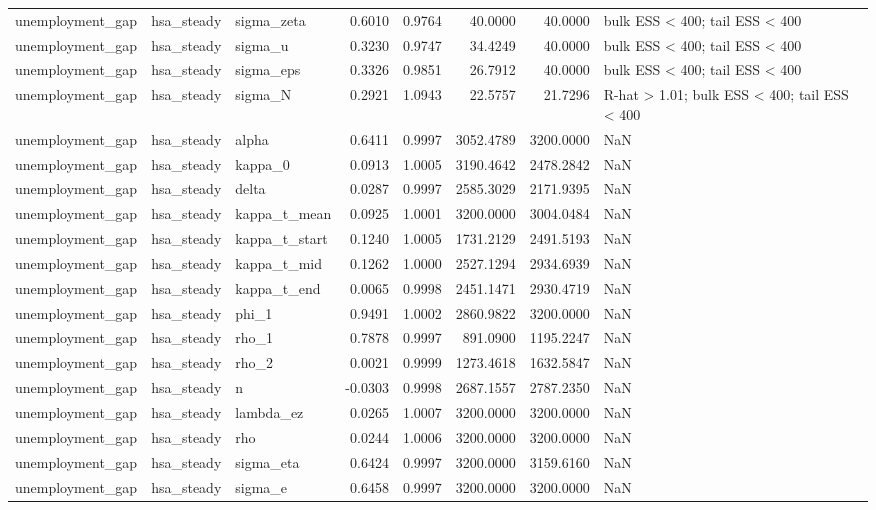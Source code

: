 \begin{tabular}{lllrrrrl}
unemployment\_gap & hsa\_steady & sigma\_zeta & 0.6010 & 0.9764 & 40.0000 & 40.0000 & bulk ESS < 400; tail ESS < 400 \\
unemployment\_gap & hsa\_steady & sigma\_u & 0.3230 & 0.9747 & 34.4249 & 40.0000 & bulk ESS < 400; tail ESS < 400 \\
unemployment\_gap & hsa\_steady & sigma\_eps & 0.3326 & 0.9851 & 26.7912 & 40.0000 & bulk ESS < 400; tail ESS < 400 \\
unemployment\_gap & hsa\_steady & sigma\_N & 0.2921 & 1.0943 & 22.5757 & 21.7296 & R-hat > 1.01; bulk ESS < 400; tail ESS < 400 \\
unemployment\_gap & hsa\_steady & alpha & 0.6411 & 0.9997 & 3052.4789 & 3200.0000 & NaN \\
unemployment\_gap & hsa\_steady & kappa\_0 & 0.0913 & 1.0005 & 3190.4642 & 2478.2842 & NaN \\
unemployment\_gap & hsa\_steady & delta & 0.0287 & 0.9997 & 2585.3029 & 2171.9395 & NaN \\
unemployment\_gap & hsa\_steady & kappa\_t\_mean & 0.0925 & 1.0001 & 3200.0000 & 3004.0484 & NaN \\
unemployment\_gap & hsa\_steady & kappa\_t\_start & 0.1240 & 1.0005 & 1731.2129 & 2491.5193 & NaN \\
unemployment\_gap & hsa\_steady & kappa\_t\_mid & 0.1262 & 1.0000 & 2527.1294 & 2934.6939 & NaN \\
unemployment\_gap & hsa\_steady & kappa\_t\_end & 0.0065 & 0.9998 & 2451.1471 & 2930.4719 & NaN \\
unemployment\_gap & hsa\_steady & phi\_1 & 0.9491 & 1.0002 & 2860.9822 & 3200.0000 & NaN \\
unemployment\_gap & hsa\_steady & rho\_1 & 0.7878 & 0.9997 & 891.0900 & 1195.2247 & NaN \\
unemployment\_gap & hsa\_steady & rho\_2 & 0.0021 & 0.9999 & 1273.4618 & 1632.5847 & NaN \\
unemployment\_gap & hsa\_steady & n & -0.0303 & 0.9998 & 2687.1557 & 2787.2350 & NaN \\
unemployment\_gap & hsa\_steady & lambda\_ez & 0.0265 & 1.0007 & 3200.0000 & 3200.0000 & NaN \\
unemployment\_gap & hsa\_steady & rho & 0.0244 & 1.0006 & 3200.0000 & 3200.0000 & NaN \\
unemployment\_gap & hsa\_steady & sigma\_eta & 0.6424 & 0.9997 & 3200.0000 & 3159.6160 & NaN \\
unemployment\_gap & hsa\_steady & sigma\_e & 0.6458 & 0.9997 & 3200.0000 & 3200.0000 & NaN \\

\end{tabular}
